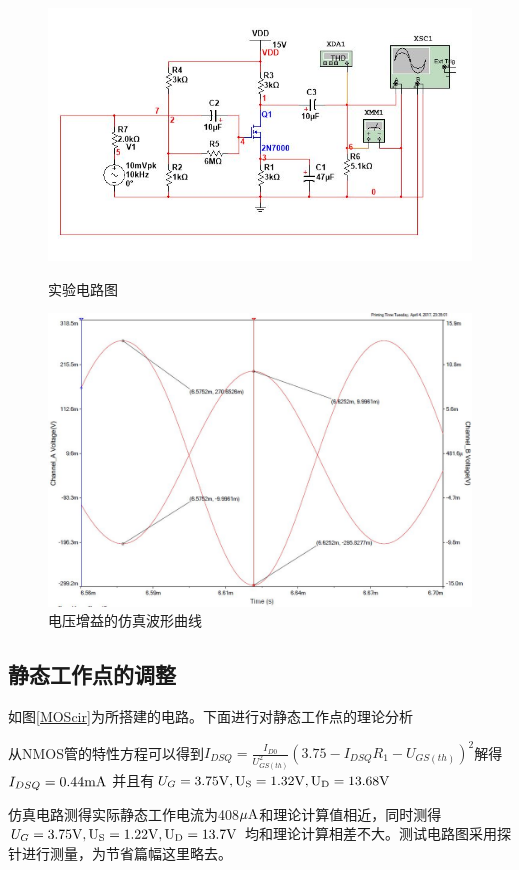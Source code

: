 \documentclass[UTF8,a4paper]{ctexart}
\begin{document}
\begin{figure}
\centering
\includegraphics[width=\textwidth]{2-3.jpg}
\caption{实验电路图}
\label{MOScir}
\includegraphics[width=\textwidth]{2-3AA.jpg}
\caption{电压增益的仿真波形曲线}
\label{MOSA}
\end{figure}
\subsection{静态工作点的调整}
如图\ref{MOScir}为所搭建的电路。下面进行对静态工作点的理论分析

从NMOS管的特性方程可以得到$I_{DSQ}=\frac{I_{D0}}{U_{GS(th)}^2}(3.75-I_{DSQ}R_1-U_{GS(th)})^2$解得$I_{DSQ}=0.44\rm{mA}$
并且有$U_G=3.75\rm{V},U_S=1.32\rm{V},U_D=13.68\rm{V}$

仿真电路测得实际静态工作电流为408$\mu\rm{A}$和理论计算值相近，同时测得$U_G=3.75\rm{V},U_S=1.22\rm{V},U_D=13.7\rm{V}$
均和理论计算相差不大。测试电路图采用探针进行测量，为节省篇幅这里略去。
\end{document}
